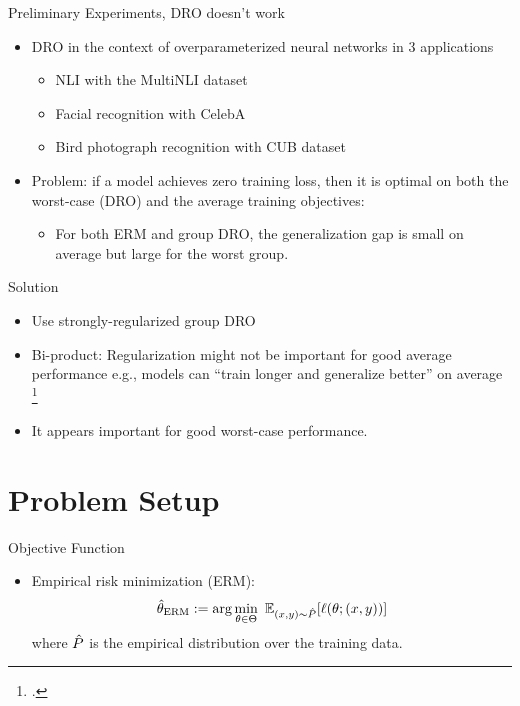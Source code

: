 \documentclass{beamer}
\begin{document}
\begin{viterbiframe}{{Preliminary Experiments, DRO doesn't work}}
\begin{itemize}
    \item DRO in the context of \alert{overparameterized} neural networks in 3 applications
    \begin{itemize}
        \item NLI with the MultiNLI dataset %
        \item Facial recognition with CelebA %
        \item Bird photograph recognition with CUB dataset %
    \end{itemize}
    \item Problem: if a model achieves \alert{zero training loss}, then it is optimal on both the worst-case (DRO) and the average training objectives:
    \begin{itemize}
        \item For both ERM and group DRO, the \alert{generalization gap} is small on average but large for the worst group.
    \end{itemize}
\end{itemize}
     
\end{viterbiframe}

\begin{viterbiframe}{Solution}

\begin{itemize}
    \item Use \alert{strongly-regularized} group DRO
    \pause
    \item Bi-product: Regularization might not be important for good \alert{average performance} e.g., models can \alert{“train longer and generalize better”} on average \footcite{hoffer2017train} 
    \pause
    \item It appears important for good worst-case performance.
\end{itemize}
\end{viterbiframe}

\section{Problem Setup}

\begin{viterbiframe}{{Objective Function}}
\begin{itemize}
    \item Empirical risk minimization (ERM):
    \begin{align}%
      \hterm := \arg\min_{\theta \in \Theta} 
      \ \E_{(x, y) \sim \hP}
    [\ell(\theta; (x, y))]
    \end{align}
    where ${\hat{P}}$ is the \alert{empirical distribution} over the training data.
    \end{itemize}
\end{viterbiframe}
\end{document}
